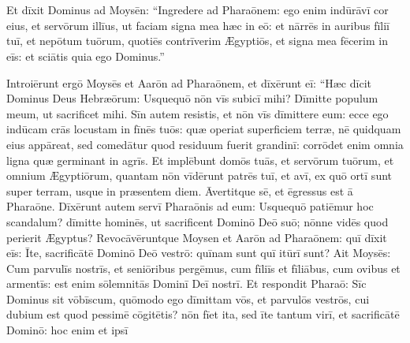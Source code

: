 \chapter{}


\thispagestyle{empty}

Et dīxit Dominus ad Moysēn: ``Ingredere ad Pharaōnem: ego enim indūrāvī cor eius, et servōrum illīus, ut faciam signa mea hæc in eō:
et nārrēs in auribus fīliī tuī, et nepōtum tuōrum,
quotiēs contrīverim Ægyptiōs, et signa mea fēcerim in eīs:
et sciātis quia ego Dominus.''

 Introiērunt ergō
Moysēs et Aarōn ad Pharaōnem, et dīxērunt eī: ``Hæc dīcit
Dominus Deus Hebræōrum: Usquequō nōn vīs
subicī mihi? Dīmitte populum meum, ut
sacrificet mihi.  Sīn autem resistis, et nōn vīs dīmittere eum: ecce
ego indūcam crās locustam in fīnēs tuōs:  quæ operiat
superficiem terræ, nē quidquam eius appāreat, sed
comedātur quod residuum
fuerit grandinī: corrōdet enim omnia ligna quæ
germinant in agrīs.  Et implēbunt domōs tuās, et servōrum
tuōrum, et omnium Ægyptiōrum, quantam nōn vīdērunt patrēs tuī, et avī, ex
quō ortī sunt super terram, usque in præsentem diem. Āvertitque sē, et
ēgressus est ā Pharaōne.  Dīxērunt autem servī
Pharaōnis ad eum: Usquequō patiēmur hoc
scandalum? dīmitte hominēs, ut sacrificent Dominō Deō suō;
nōnne vidēs quod perierit Ægyptus?  Revocāvēruntque Moysen et Aarōn ad
Pharaōnem: quī dīxit eīs: Īte, sacrificātē Dominō Deō vestrō: quīnam
sunt quī itūrī sunt?  Ait Moysēs: Cum parvulīs nostrīs, et seniōribus
pergēmus, cum fīliīs et fīliābus, cum ovibus et armentīs:
est enim sōlemnitās Dominī Deī nostrī.  Et respondit
Pharaō: Sīc Dominus sit vōbīscum, quōmodo ego dīmittam
vōs, et parvulōs vestrōs, cui dubium est quod pessimē cōgitētis?  nōn
fīet ita, sed īte tantum virī, et sacrificātē Dominō: hoc enim et ipsī
